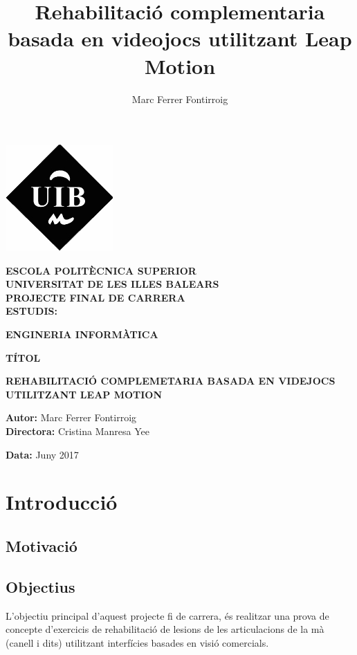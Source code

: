 \documentclass[12pt,a4paper,catalan]{article}
\author{Marc Ferrer Fontirroig}
\title{Rehabilitació complementaria basada en videojocs utilitzant Leap Motion}
\begin{document}
	\begin{center}
		\includegraphics{uib-logo.jpg}
	\end{center}
	\begin{center}
		\textbf{ESCOLA POLITÈCNICA SUPERIOR}\\
		\textbf{UNIVERSITAT DE LES ILLES BALEARS}\\
		\vspace{2em}
		\textbf{PROJECTE FINAL DE CARRERA}\\
		\vspace{1.5em}
		\textbf{ESTUDIS:}
		\begin{framed}
			\textbf{ENGINERIA INFORMÀTICA}
		\end{framed}
		\textbf{TÍTOL}
		\begin{framed}
			\textbf{REHABILITACIÓ COMPLEMETARIA BASADA EN VIDEJOCS UTILITZANT LEAP MOTION}
		\end{framed}
		\vspace{1.7em}
	\end{center}
	\begin{flushright}
		\textbf{Autor:} Marc Ferrer Fontirroig\\
		\textbf{Directora:} Cristina Manresa Yee\\
	\end{flushright}
	\textbf{Data:} Juny 2017
	\newpage
	\tableofcontents
	\newpage
	\section{Introducció}
	\subsection{Motivació}
	\subsection{Objectius}
	L’objectiu principal d’aquest projecte fi de carrera, és realitzar una prova de concepte d’exercicis de rehabilitació de lesions de les articulacions de la mà (canell i dits) utilitzant interfícies basades en visió comercials.
	
\end{document}
